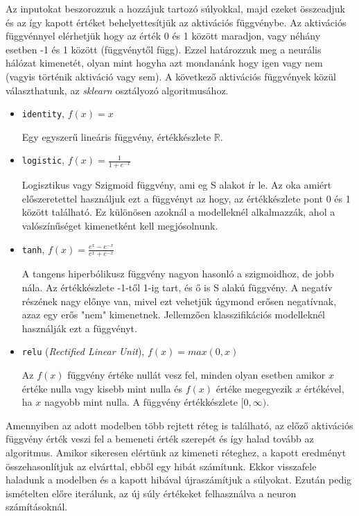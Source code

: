 Az inputokat beszorozzuk a hozzájuk tartozó súlyokkal, majd ezeket összeadjuk és az így kapott értéket behelyettesítjük az aktivációs függvénybe.
Az aktivációs függvénnyel elérhetjük hogy az érték 0 és 1 között maradjon, vagy néhány esetben -1 és 1 között (függvénytől függ). Ezzel határozzuk meg a neurális hálózat kimenetét, olyan mint hogyha azt mondanánk hogy igen vagy nem (vagyis történik aktiváció vagy sem). 
A következő aktivációs függvények közül választhatunk, az \textit{sklearn} osztályozó algoritmusához.
\begin{itemize}
\item \texttt{identity}, $f(x) = x$

Egy egyszerű lineáris függvény, értékkészlete $\mathbb{R}$.
\item \texttt{logistic}, $f(x) = \frac{1}{1+e^{-x}}$

Logisztikus vagy Szigmoid függvény, ami eg S alakot ír le. Az oka amiért előszeretettel használjuk ezt a függvényt az hogy, az értékkészlete pont 0 és 1 között található. Ez különösen azoknál a modelleknél alkalmazzák, ahol a valószínűséget kimenetként kell megjósolnunk.
\item \texttt{tanh}, $f(x) = \frac{e^{x}-e^{-x}}{e^{x}+e^{-x}}$

A tangens hiperbólikusz függvény nagyon hasonló a szigmoidhoz, de jobb nála. Az értékkészlete -1-től 1-ig tart, és ő is S alakú függvény.
A negatív részének nagy előnye van, mivel ezt vehetjük úgymond erősen negatívnak, azaz egy erős "nem" kimenetnek. Jellemzően klasszifikációs modelleknél használják ezt a függvényt.
\item \texttt{relu} (\textit{Rectified Linear Unit}), $f(x) = max(0,x)$

Az $f(x)$ függvény értéke nullát vesz fel, minden olyan esetben amikor $x$ értéke nulla vagy kisebb mint nulla és $f(x)$ értéke megegyezik $x$ értékével, ha $x$ nagyobb mint nulla.
A függvény értékkészlete $[0,\infty)$.
\end{itemize}

Amennyiben az adott modelben több rejtett réteg is található, az előző aktivációs függvény érték veszi fel a bemeneti érték szerepét és így halad tovább az algoritmus. Amikor sikeresen elértünk az kimeneti réteghez, a kapott eredményt összehasonlítjuk az elvárttal, ebből egy hibát számítunk.
Ekkor visszafele haladunk a modelben és a kapott hibával újraszámítjuk a súlyokat.
Ezután pedig ismételten előre iterálunk, az új súly értékeket felhasználva a neuron számításoknál.

